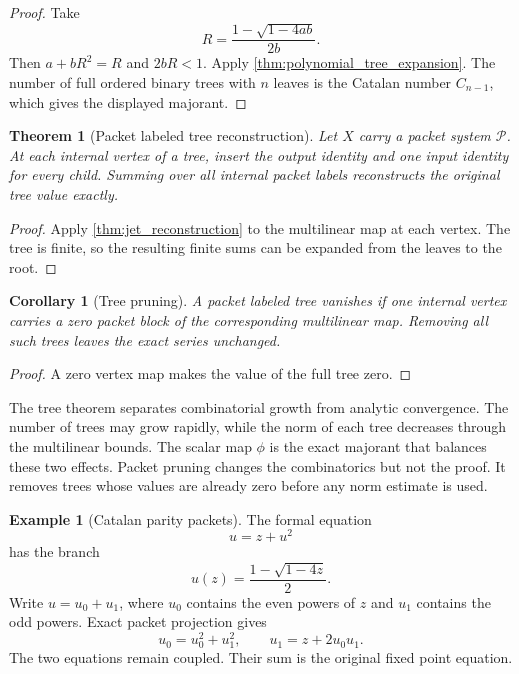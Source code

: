 \documentclass{aomart}
\newtheorem{theorem}{Theorem}[section]
\newtheorem{corollary}[corollary]{Corollary}
\theoremstyle{definition}
\newtheorem{example}[example]{Example}
\theoremstyle{remark}
\newcommand{\Pcal}{\mathcal P}
\begin{document}
\begin{proof}
Take
\[
R=
\frac{1-\sqrt{1-4ab}}{2b}.
\]
Then $a+bR^2=R$ and $2bR<1$.  Apply \cref{thm:polynomial_tree_expansion}.  The number of full ordered binary trees with $n$ leaves is the Catalan number $C_{n-1}$, which gives the displayed majorant.
\end{proof}

\begin{theorem}[Packet labeled tree reconstruction]\label{thm:packet_tree_reconstruction}
Let $X$ carry a packet system $\Pcal$.  At each internal vertex of a tree, insert the output identity and one input identity for every child.  Summing over all internal packet labels reconstructs the original tree value exactly.
\end{theorem}

\begin{proof}
Apply \cref{thm:jet_reconstruction} to the multilinear map at each vertex.  The tree is finite, so the resulting finite sums can be expanded from the leaves to the root.
\end{proof}

\begin{corollary}[Tree pruning]\label{cor:tree_pruning}
A packet labeled tree vanishes if one internal vertex carries a zero packet block of the corresponding multilinear map.  Removing all such trees leaves the exact series unchanged.
\end{corollary}

\begin{proof}
A zero vertex map makes the value of the full tree zero.
\end{proof}


The tree theorem separates combinatorial growth from analytic convergence.  The number of trees may grow rapidly, while the norm of each tree decreases through the multilinear bounds.  The scalar map $\phi$ is the exact majorant that balances these two effects.  Packet pruning changes the combinatorics but not the proof.  It removes trees whose values are already zero before any norm estimate is used.

\begin{example}[Catalan parity packets]\label{ex:catalan_parity}
The formal equation
\[
u=z+u^2
\]
has the branch
\[
u(z)=\frac{1-\sqrt{1-4z}}2.
\]
Write $u=u_0+u_1$, where $u_0$ contains the even powers of $z$ and $u_1$ contains the odd powers.  Exact packet projection gives
\[
u_0=u_0^2+u_1^2,
\qquad
u_1=z+2u_0u_1.
\]
The two equations remain coupled.  Their sum is the original fixed point equation.
\end{example}
\end{document}
